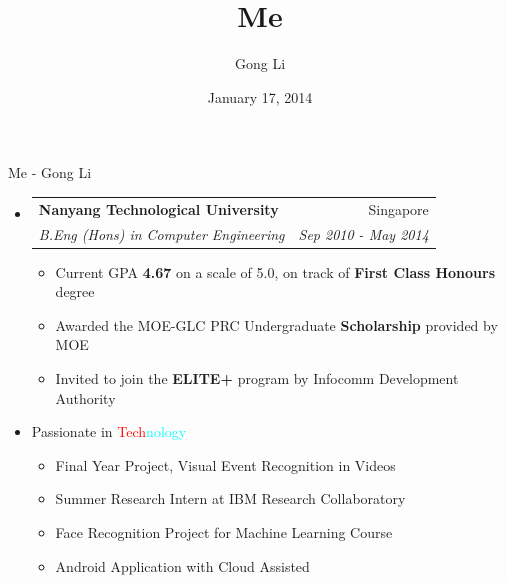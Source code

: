 \documentclass{beamer}
\title{Me}
\author{Gong Li}
\date{January 17, 2014}
\makeatletter
\newcommand{\resitem}[1]{\item \footnotesize {#1} \vspace{0pt}}
\newcommand{\ressubheading}[4]{
\begin{tabular*}{4.4in}{l@{\extracolsep{\fill}}r}
		
		\textbf{#1} & \scriptsize{#2} \\
		\textit{#3} & \scriptsize{\textit{#4}} \\

\end{tabular*}\vspace{-6pt}}
\makeatother
\begin{document}
	\begin{frame}{Me - Gong Li}
		\begin{itemize}
		\item
			\ressubheading{Nanyang Technological University}{Singapore}{B.Eng (Hons) in Computer Engineering}{Sep 2010 - May 2014}
			\begin{itemize}
				\resitem {Current GPA \textbf{4.67} on a scale of 5.0, on track of \textbf{First Class Honours} degree}
				\resitem {Awarded the MOE-GLC PRC Undergraduate \textbf{Scholarship} provided by MOE}
				\resitem {Invited to join the \textbf{ELITE+} program by Infocomm Development Authority}
			\end{itemize}

		\item Passionate in \textcolor{red}{Tech}\textcolor{cyan}{nology}
			\begin{itemize}
			\item Final Year Project, Visual Event Recognition in Videos
			\item Summer Research Intern at IBM Research Collaboratory
			\item Face Recognition Project for Machine Learning Course
			\item Android Application with Cloud Assisted
			\end{itemize}
		\end{itemize} 
	\end{frame}
\end{document}
